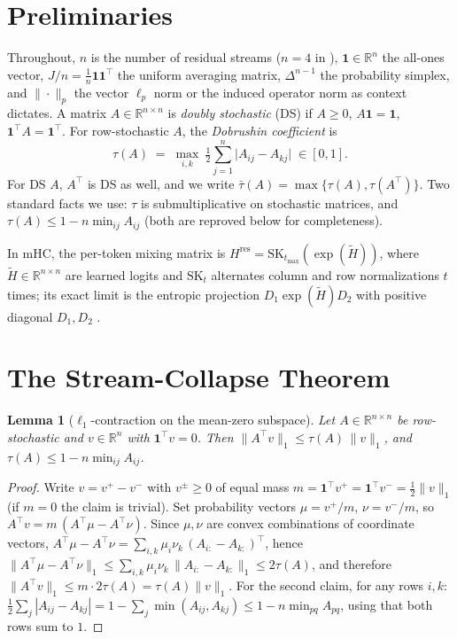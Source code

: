 \documentclass[11pt]{article}
\newtheorem{lemma}{Lemma}
\newcommand{\R}{\mathbb{R}}
\newcommand{\ones}{\mathbf{1}}
\newcommand{\Hres}{H^{\mathrm{res}}}
\newcommand{\J}{\tfrac{1}{n}\ones\ones^{\!\top}}
\begin{document}
\section{Preliminaries}
Throughout, $n$ is the number of residual streams ($n=4$ in \citep{xie2025mhc}), $\ones\in\R^n$ the all-ones vector, $J/n=\J$ the uniform averaging matrix, $\Delta^{n-1}$ the probability simplex, and $\|\cdot\|_p$ the vector $\ell_p$ norm or the induced operator norm as context dictates. A matrix $A\in\R^{n\times n}$ is \emph{doubly stochastic} (DS) if $A\ge0$, $A\ones=\ones$, $\ones^{\!\top}A=\ones^{\!\top}$. For row-stochastic $A$, the \emph{Dobrushin coefficient} is
\begin{equation}
\tau(A)\;=\;\max_{i,k}\ \tfrac12\sum_{j=1}^n\big|A_{ij}-A_{kj}\big|\;\in[0,1].
\end{equation}
For DS $A$, $A^{\!\top}$ is DS as well, and we write $\bar\tau(A)=\max\{\tau(A),\tau(A^{\!\top})\}$. Two standard facts we use: $\tau$ is submultiplicative on stochastic matrices, and $\tau(A)\le 1-n\min_{ij}A_{ij}$ (both are reproved below for completeness).

In mHC, the per-token mixing matrix is $\Hres=\mathrm{SK}_{t_{\max}}(\exp(\tilde H))$, where $\tilde H\in\R^{n\times n}$ are learned logits and $\mathrm{SK}_t$ alternates column and row normalizations $t$ times; its exact limit is the entropic projection $D_1\exp(\tilde H)D_2$ with positive diagonal $D_1,D_2$ \citep{sinkhorn1967}.

\section{The Stream-Collapse Theorem}
\label{sec:collapse}

\begin{lemma}[$\ell_1$-contraction on the mean-zero subspace]
\label{lem:dobrushin}
Let $A\in\R^{n\times n}$ be row-stochastic and $v\in\R^n$ with $\ones^{\!\top}v=0$. Then
$\|A^{\!\top}v\|_1\le\tau(A)\,\|v\|_1$, and $\tau(A)\le 1-n\min_{ij}A_{ij}$.
\end{lemma}
\begin{proof}
Write $v=v^+-v^-$ with $v^\pm\ge0$ of equal mass $m=\ones^{\!\top}v^+=\ones^{\!\top}v^-=\tfrac12\|v\|_1$ (if $m=0$ the claim is trivial). Set probability vectors $\mu=v^+/m$, $\nu=v^-/m$, so $A^{\!\top}v=m\,(A^{\!\top}\mu-A^{\!\top}\nu)$. Since $\mu,\nu$ are convex combinations of coordinate vectors, $A^{\!\top}\mu-A^{\!\top}\nu=\sum_{i,k}\mu_i\nu_k\,(A_{i:}-A_{k:})^{\!\top}$, hence
$\|A^{\!\top}\mu-A^{\!\top}\nu\|_1\le\sum_{i,k}\mu_i\nu_k\,\|A_{i:}-A_{k:}\|_1\le 2\tau(A)$,
and therefore $\|A^{\!\top}v\|_1\le m\cdot2\tau(A)=\tau(A)\|v\|_1$.
For the second claim, for any rows $i,k$: $\tfrac12\sum_j|A_{ij}-A_{kj}|=1-\sum_j\min(A_{ij},A_{kj})\le 1-n\min_{pq}A_{pq}$, using that both rows sum to $1$.
\end{proof}
\end{document}
